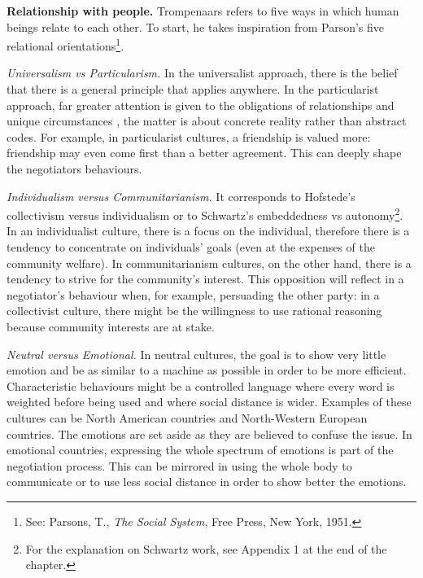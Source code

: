 \documentclass[../main.tex]{subfiles}
\begin{document}
\textbf{Relationship with people.} Trompenaars refers to five ways in which human beings relate to each other. To start, he takes inspiration from Parson's five relational orientations\footnote{See: Parsons, T., \textit{The Social System}, Free Press, New York, 1951.}.

\textit{Universalism vs Particularism.} In the universalist approach, there is the belief that there is a general principle that applies anywhere. In the particularist approach, far greater attention is given to the obligations of relationships and unique circumstances \autocite[9]{trompenaars}, the matter is about concrete reality rather than abstract codes. For example, in particularist cultures, a friendship is valued more: friendship may even come first than a better agreement. This can deeply shape the negotiators behaviours.

\textit{Individualism versus Communitarianism.} It corresponds to Hofstede's collectivism versus individualism or to Schwartz's embeddedness vs autonomy\footnote{For the explanation on Schwartz work, see Appendix 1 at the end of the chapter.}. In an individualist culture, there is a focus on the individual, therefore there is a tendency to concentrate on individuals' goals (even at the expenses of the community welfare). In communitarianism cultures, on the other hand, there is a tendency to strive for the community's interest. This opposition will reflect in a negotiator's behaviour when, for example, persuading the other party: in a collectivist culture, there might be the willingness to use rational reasoning because community interests are at stake.

\textit{Neutral versus Emotional.} In neutral cultures, the goal is to show very little emotion and be as similar to a machine as possible in order to be more efficient. Characteristic behaviours might be a controlled language where every word is weighted before being used and where social distance is wider. Examples of these cultures can be North American countries and North-Western European countries. The emotions are set aside as they are believed to confuse the issue. In emotional countries, expressing the whole spectrum of emotions is part of the negotiation process. This can be mirrored in using the whole body to communicate or to use less social distance in order to show better the emotions.
\end{document}
